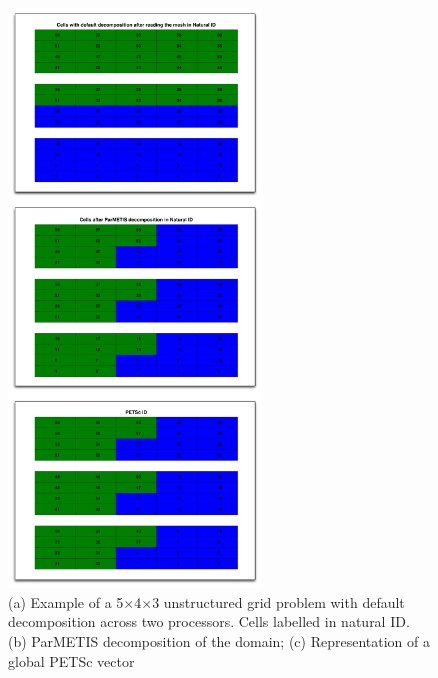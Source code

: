 \documentclass[12pt]{article}
\begin{document}
\begin{figure}\centering
\includegraphics[width=0.6\textwidth]{./figs/5x4x3_domain}
\caption{
(a) Example of a 5$\times$4$\times$3 unstructured grid problem 
with default decomposition across two processors. Cells labelled in natural ID.
(b) ParMETIS decomposition of the domain; 
(c) Representation of a global PETSc vector}
\label{fig:543_domain_decomp}
\end{figure}
\end{document}
